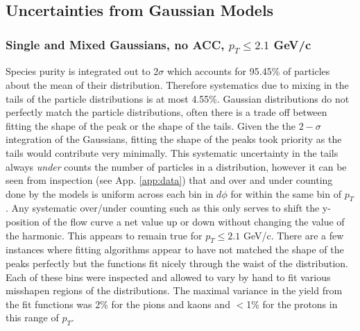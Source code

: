 \subsection{Uncertainties from Gaussian Models}
\subsubsection{Single and Mixed Gaussians, no ACC, $p_T\leq2.1$ GeV/c}
Species purity is integrated out to $2\sigma$ which accounts for 95.45\% of particles about the mean of their distribution. Therefore systematics due to mixing in the tails of the particle distributions is at most 4.55\%. Gaussian distributions do not perfectly match the particle distributions, often there is a trade off between fitting the shape of the peak or the shape of the tails. Given the the $2-\sigma$ integration of the Gaussians, fitting the shape of the peaks took priority as the tails would contribute very minimally. This systematic uncertainty in the tails always \textit{under} counts the number of particles in a distribution, however it can be seen from inspection (see App. \ref{app:data}) that and over and under counting done by the models is uniform across each bin in $d\phi$ for within the same bin of $p_T$. Any systematic over/under counting such as this only serves to shift the y-position of the flow curve a net value up or down without changing the value of the harmonic. This appears to remain true for $p_T \leq 2.1$ GeV/c. There are a few instances where fitting algorithms appear to have not matched the shape of the peaks perfectly but the functions fit nicely through the waist of the distribution. Each of these bins were inspected and allowed to vary by hand to fit various misshapen regions of the distributions. The maximal variance in the yield from the fit functions was 2\% for the pions and kaons and $<$1\% for the protons in this range of $p_T$.

